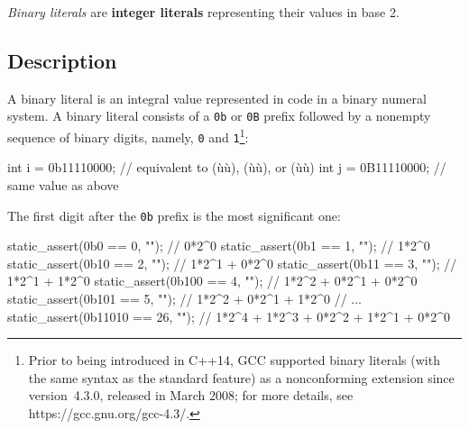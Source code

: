 
\textit{Binary literals} are \textbf{integer literals} representing their values in base 2.

\subsection[Description]{Description}\label{description-binary}

A binary literal is an integral value represented in code in a binary numeral system. A binary literal consists of a \lstinline!0b! or \lstinline!0B! prefix followed by a nonempty sequence of binary digits, namely, \lstinline!0! and \lstinline!1!{\cprotect\footnote{Prior to being introduced in C++14, GCC supported binary literals (with the same syntax as the standard feature) as a nonconforming extension since version~4.3.0, released in March 2008;
for more details, see https://gcc.gnu.org/gcc-4.3/.}}:


\begin{emcppslisting}[emcppsbatch=e1]
int i = 0b11110000;  // equivalent to (ù{}ù), (ù{}ù), or (ù{}ù)
int j = 0B11110000;  // same value as above
\end{emcppslisting}

\noindent The first digit after the \lstinline!0b! prefix is the most significant
one:

\begin{emcppslisting}[emcppsbatch=e1]
static_assert(0b0     ==  0, "");  // 0*2^0
static_assert(0b1     ==  1, "");  // 1*2^0
static_assert(0b10    ==  2, "");  // 1*2^1 + 0*2^0
static_assert(0b11    ==  3, "");  // 1*2^1 + 1*2^0
static_assert(0b100   ==  4, "");  // 1*2^2 + 0*2^1 + 0*2^0
static_assert(0b101   ==  5, "");  // 1*2^2 + 0*2^1 + 1*2^0
// ...
static_assert(0b11010 == 26, "");  // 1*2^4 + 1*2^3 + 0*2^2 + 1*2^1 + 0*2^0
\end{emcppslisting}


